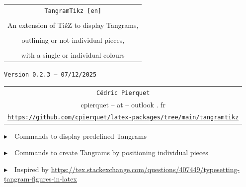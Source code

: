 \documentclass{article}
\def\TPversion{0.2.3}
\def\TPdate{07/12/2025}
\begin{document}
\pagestyle{fancy}

\thispagestyle{empty}

\vspace{2cm}

\begin{center}
	\begin{minipage}{0.75\linewidth}
	\begin{tcolorbox}[colframe=yellow,colback=yellow!15]
		\begin{center}
			\begin{tabular}{c}
				{\Huge \texttt{TangramTikz [en]}}\\
				\\
				{\LARGE An extension of Ti\textit{k}Z to display Tangrams,} \\
				\\
				{\LARGE outlining or not individual pieces,} \\
				\\
				{\LARGE with a single or individual colours} \\
			\end{tabular}
			
			\medskip
			
			{\small \texttt{Version \TPversion{} -- \TPdate}}
		\end{center}
	\end{tcolorbox}
\end{minipage}
\end{center}

\vspace{0.5cm}

\begin{center}
	\begin{tabular}{c}
	\texttt{Cédric Pierquet}\\
	{\ttfamily cpierquet -- at -- outlook . fr}\\
	\texttt{\url{https://github.com/cpierquet/latex-packages/tree/main/tangramtikz}}
\end{tabular}
\end{center}

\vspace{0.5cm}

{$\blacktriangleright$~~Commands to display predefined Tangrams}

\smallskip

{$\blacktriangleright$~~Commands to create Tangrams by positioning individual pieces}

\smallskip

{$\blacktriangleright$~~Inspired by \url{https://tex.stackexchange.com/questions/407449/typesetting-tangram-figures-in-latex}}
\end{document}
